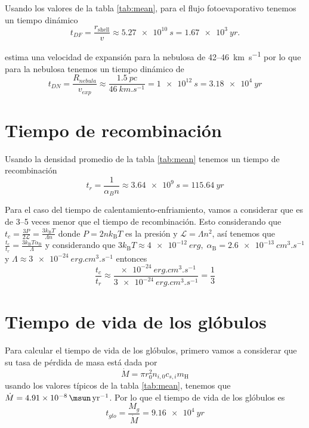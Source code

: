 \documentclass{book}
\begin{document}
Usando los valores de la tabla \ref{tab:mean}, para el flujo fotoevaporativo tenemos un tiempo dinámico 
\begin{equation}
t_{DF} = \frac{r_\mathrm{shell}}{v} \approx \SI{5.27e10}{s}  = \SI{1.67e3}{yr}.
\end{equation}

\cite{Mancherko:2010} estima una velocidad de expansión para la nebulosa de 42--\SI{46}{km.s^{-1}} por lo que para la nebulosa tenemos un tiempo dinámico de 
\begin{equation}
t_{DN}= \frac{R_{nebula}}{v_{exp}}\approx\frac{\SI{1.5}{pc}}{\SI{46}{km.s^{-1}}}= \SI{1e12}{s}=\SI{3.18e4}{yr}
\end{equation}

\section{Tiempo de recombinación}

Usando la densidad promedio de la tabla \ref{tab:mean} tenemos un tiempo de recombinación 
\begin{equation}
t_r = \frac{1}{\alpha_B n} \approx \SI{3.64e9}{s}= \SI{115.64}{yr}
\end{equation}

Para el caso del tiempo de calentamiento-enfriamiento, vamos a considerar que es de 3--5 veces menor que el tiempo de recombinación. Esto considerando que $t_c=\frac{3P}{2\mathcal{L}}=\frac{3k_\mathrm{B}T}{\Lambda n}$ donde $P=2nk_\mathrm{B}T$ es la presión y $\mathcal{L}=\Lambda n^2$, así tenemos que $\frac{t_c}{t_r}=\frac{3k_\mathrm{B}T\alpha_\mathrm{B}}{\Lambda}$ y considerando que $3k_\mathrm{B}T\approx\SI{4e-12}{erg},\; \alpha_\mathrm{B}=\SI{2.6e-13}{cm^3.s^{-1}}$ y $\Lambda\approx\SI{3e-24}{erg.cm^3.s^{-1}}$ entonces
\begin{equation}
    \frac{t_c}{t_r}\approx\frac{\SI{e-24}{erg.cm^3.s^{-1}}}{\SI{3e-24}{erg.cm^3.s^{-1}}}=\frac{1}{3}
\end{equation}

\section{Tiempo de vida de los glóbulos}

Para calcular el tiempo de vida de los glóbulos, primero vamos a considerar que su tasa de pérdida de masa está dada por 
\begin{equation}
    \dot{M} =\pi r_0^2n_{i,0}c_{s,i}m_\mathrm{H}
\end{equation}
usando los valores típicos de la tabla \ref{tab:mean}, tenemos que $\dot{M} = \SI{4.91e-8}{\msun.yr^{-1}}$. Por lo que el tiempo de vida de los glóbulos es
\begin{equation}
    t_{glo}=\frac{M_g}{\dot{M}}=\SI{9.16e4}{yr}
\end{equation}
\end{document}
